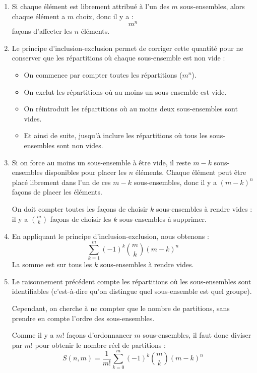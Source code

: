 \documentclass[10pt,a4paper]{article}
\begin{document}
\begin{enumerate}
        \item Si chaque élément est librement attribué à l'un des \( m \) sous-ensembles, alors chaque élément a
        \( m \) choix, donc il y a :
        \[
        m^n
        \]
        façons d'affecter les \( n \) éléments.

        \item Le principe d'inclusion-exclusion permet de corriger cette quantité pour ne conserver
        que les répartitions où chaque sous-ensemble est non vide :
        \begin{itemize}
            \item On commence par compter toutes les répartitions (\( m^n \)).
            \item On exclut les répartitions où au moins un sous-ensemble est vide.
            \item On réintroduit les répartitions où au moins deux sous-ensembles sont vides.
            \item Et ainsi de suite, jusqu'à inclure les répartitions où tous les sous-ensembles
            sont non vides.
        \end{itemize}

        \item Si on force au moins un sous-ensemble à être vide, il reste \( m-k \) sous-ensembles
        disponibles pour placer les \( n \) éléments. Chaque élément peut être placé librement
        dans l'un de ces \( m-k \) sous-ensembles, donc il y a \( (m-k)^n \) façons de placer les
        éléments.

        On doit compter toutes les façons de choisir \( k \) sous-ensembles à rendre vides : il y a
        \( \binom{m}{k} \) façons de choisir les \( k \) sous-ensembles à supprimer.

        \item En appliquant le principe d'inclusion-exclusion, nous obtenons :
        \[
        \sum_{k=1}^{m} (-1)^k \binom{m}{k} (m-k)^n
        \]
        La somme est sur tous les \( k \) sous-ensembles à rendre vides.

        \item Le raisonnement précédent compte les répartitions où les sous-ensembles sont
        identifiables (c'est-à-dire qu'on distingue quel sous-ensemble est quel groupe).

        Cependant, on cherche à ne compter que le nombre de partitions, sans prendre en compte l'ordre des
        sous-ensembles.

        Comme il y a \( m! \) façons d'ordonnancer \( m \) sous-ensembles, il faut donc diviser par \( m! \)
        pour obtenir le nombre réel de partitions :
        \[
        S(n, m) = \frac{1}{m!} \sum_{k=0}^{m} (-1)^k \binom{m}{k} (m-k)^n
        \]

    \end{enumerate}
\end{document}
